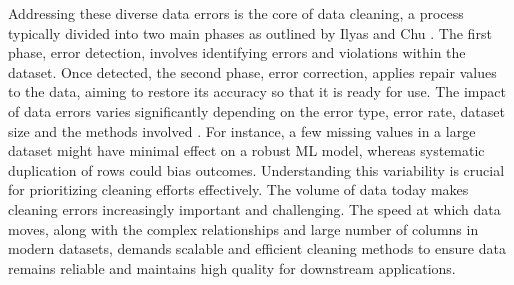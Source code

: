 Addressing these diverse data errors is the core of data cleaning, a process typically divided into two main phases as outlined by Ilyas and Chu \cite{DC}. 
The first phase, error detection, involves identifying errors and violations within the dataset. 
Once detected, the second phase, error correction, applies repair values to the data, aiming to restore its accuracy so that it is ready for use. 
The impact of data errors varies significantly depending on the error type, error rate, dataset size and the methods involved \cite{PAPER4}. 
For instance, a few missing values in a large dataset might have minimal effect on a robust ML model, whereas systematic duplication of rows could bias outcomes. 
Understanding this variability is crucial for prioritizing cleaning efforts effectively. 
The volume of data today makes cleaning errors increasingly important and challenging. 
The speed at which data moves, along with the complex relationships and large number of columns in modern datasets, demands scalable and efficient cleaning methods to ensure data remains reliable and maintains high quality for downstream applications. 

